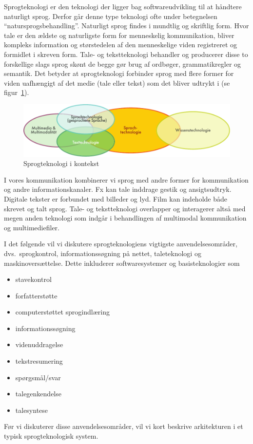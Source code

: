 \documentclass[]{../../metanetpaper}
\begin{document}
\begin{multicols}{2}

 Sprogteknologi er den teknologi der ligger bag softwareudvikling til at h\aa ndtere naturligt sprog. Derfor g\aa r denne type teknologi ofte under betegnelsen ``natursprogsbehandling''. Naturligt sprog findes i mundtlig og skriftlig form.  Hvor tale er den \ae ldste og naturligste form for menneskelig kommunikation, bliver kompleks information og st\o rstedelen af den menneskelige viden registreret og formidlet i skreven form.  Tale- og tekstteknologi behandler og producerer disse to forskellige slags sprog sk\o nt de begge g\o r brug af ordb\o ger, grammatikregler og semantik. Det betyder at sprogteknologi forbinder sprog med flere former for viden uafh\ae ngigt af det medie (tale eller tekst) som det bliver udtrykt i  (se figur~\ref{fig:ltincontext_de}).  

\begin{figure}[htb]
  \center
  \includegraphics[width=\textwidth]{../_media/german/language_technologies}
  \caption{Sprogteknologi i kontekst}
  \label{fig:ltincontext_de}
\end{figure}

I vores kommunikation kombinerer vi sprog med andre former for kommunikation og andre informationskanaler. Fx kan tale inddrage gestik og ansigtsudtryk. Digitale tekster er forbundet med billeder og lyd. Film kan indeholde b\aa de skrevet og talt sprog. Tale- og tekstteknologi overlapper og interagerer \mbox{alts\aa} med megen anden teknologi som indg\aa r i behandlingen af multimodal kommunikation og multimediefiler.

I det f\o lgende vil vi diskutere sprogteknologiens vigtigste anvendelsesomr\aa der, dvs.\ sprogkontrol, informationss\o gning \mbox{p\aa} nettet, taleteknologi og maskinovers\ae ttelse. Dette inkluderer softwaresystemer og basisteknologier som 

\begin{itemize}
      \item stavekontrol
      \item forfatterst\o tte
      \item computerst\o ttet sprogindl\ae ring
      \item informationss\o gning
      \item videnuddragelse
      \item tekstresumering
      \item sp\o rgsm\aa l/svar
      \item talegenkendelse
      \item talesyntese
    \end{itemize}
    \sloppy
  F\o r vi diskuterer disse anvendelses\-omr\aa der, vil vi kort beskrive arkitekturen i et typisk sprogteknologisk system.



\end{multicols}
\end{document}
